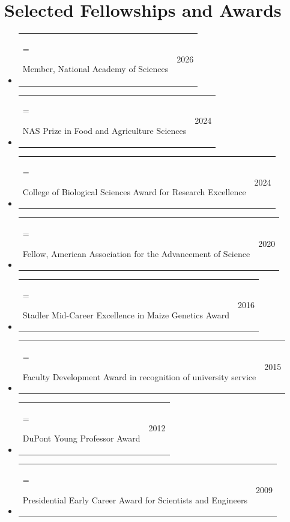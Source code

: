 \documentclass[letterpaper,10pt]{article}
\makeatletter
\newlength{\cvhang}\setlength{\cvhang}{1.5em}
\newcommand{\cvitem}[3][\cvhang]{%
  \item\begin{tabularx}{\dimexpr\linewidth+\cvhang\relax}{@{}>{\hangindent=#1\hangafter=1\raggedright\arraybackslash}X@{\hspace{1.5em}}r@{}}
    #2 & #3
  \end{tabularx}%
}
\makeatother
\begin{document}
\section*{Selected Fellowships and Awards}
\begin{itemize}
\cvitem{Member, National Academy of Sciences}{2026}
\cvitem{NAS Prize in Food and Agriculture Sciences}{2024}
\cvitem{College of Biological Sciences Award for Research Excellence}{2024}
\cvitem{Fellow, American Association for the Advancement of Science}{2020}
\cvitem{Stadler Mid-Career Excellence in Maize Genetics Award}{2016}
\cvitem{Faculty Development Award in recognition of university service}{2015}
\cvitem{DuPont Young Professor Award}{2012}
\cvitem{Presidential Early Career Award for Scientists and Engineers}{2009}
\end{itemize}

\end{document}
